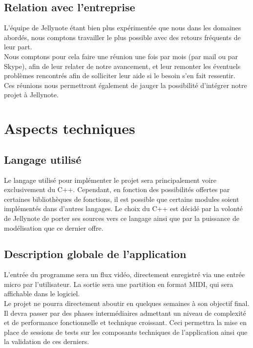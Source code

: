 \documentclass[12pt]{article}
\begin{document}
\subsection{Relation avec l'entreprise}

L’équipe de Jellynote étant bien plus expérimentée que nous dans les domaines abordés, nous comptons travailler le plus possible avec des retours fréquents de leur part.\\

Nous comptons pour cela faire une réunion une fois par mois (par mail ou par Skype), afin de leur relater de notre avancement, et leur remonter les éventuels problèmes rencontrés afin de solliciter leur aide si le besoin s’en fait ressentir.\\

Ces réunions nous permettront également de jauger la possibilité d’intégrer notre projet à Jellynote.

\newpage
\section{Aspects techniques}
\subsection{Langage utilisé}

Le langage utilisé pour implémenter le projet sera principalement voire exclusivement du C++. Cependant, en fonction des possibilités offertes par certaines bibliothèques de fonctions, il est possible que certains modules soient implémentés dans d’autres langages. Le choix du C++ est décidé par la volonté de Jellynote de porter ses sources vers ce langage ainsi que par la puissance de modélisation que ce dernier offre.\\

\subsection{Description globale de l’application}

L’entrée du programme sera un flux vidéo, directement enregistré via une entrée micro par l'utilisateur. La sortie sera une partition en format MIDI, qui sera affichable dans le logiciel.\\

Le projet ne pourra directement aboutir en quelques semaines à son objectif final. Il devra passer par des phases intermédiaires admettant un niveau de complexité et de performance fonctionnelle et technique croissant. Ceci permettra la mise en place de sessions de tests sur les composants techniques de l’application ainsi que la validation de ces derniers.\\
\end{document}
